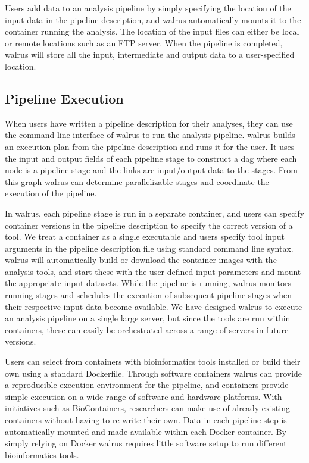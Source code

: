 Users add data to an analysis pipeline by simply specifying the location of the
input data in the pipeline description, and walrus automatically mounts it to
the container running the analysis. The location of the input files can either
be local or remote locations such as an FTP server. When the pipeline is
completed, walrus will store all the input, intermediate and output data to a
user-specified location.  

\subsection{Pipeline Execution}
When users have written a pipeline description for their analyses, they can use
the command-line interface of walrus to run the analysis pipeline. 
walrus builds an execution plan from the pipeline description and runs it for
the user. It uses the input and output fields of each pipeline stage to
construct a \gls{dag} where each node is a pipeline stage and the links are
input/output data to the stages. From this graph walrus can determine
parallelizable stages and coordinate the execution of the pipeline.

In walrus, each pipeline stage is run in a separate container, 
and users can specify container versions in the pipeline description to specify
the correct version of a tool. We treat a
container as a single executable and users specify tool input arguments in the
pipeline description file using standard command line syntax. walrus will
automatically build or download the container images with the analysis tools,
and start these with the user-defined input parameters and mount the appropriate
input datasets. While the pipeline is running, walrus monitors running stages
and schedules the execution of subsequent pipeline stages when their respective
input data become available. We have designed walrus to execute an analysis
pipeline on a single large server, but since the tools are run within
containers, these can easily be orchestrated across a range of servers in future
versions. 

Users can select from containers with bioinformatics tools installed or build
their own using a standard Dockerfile. Through software containers walrus can
provide a reproducible execution environment for the pipeline, and containers
provide simple execution on a wide range of software and hardware platforms.
With initiatives such as BioContainers,\cite{biocontainers} researchers can make
use of already existing containers without having to re-write their own. Data in
each pipeline step is automatically mounted and made available within each
Docker container. By simply relying on Docker walrus requires little software
setup to run different bioinformatics tools. 

